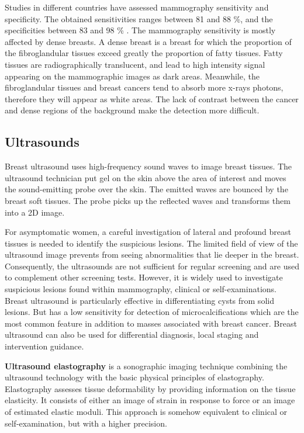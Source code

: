 
Studies in different countries have assessed mammography sensitivity and specificity. The obtained sensitivities ranges between 81 and 88 \%, and the specificities between 83 and 98 \% \citep{kemp_comparing_2015,hofvind_sensitivity_2012}. The mammography sensitivity is mostly affected by dense breasts. A dense breast is a breast for which the  proportion of the fibroglandular tissues exceed greatly the proportion of fatty tissues. Fatty tissues are radiographically translucent, and lead to high intensity signal appearing on the mammographic images as dark areas. Meanwhile, the fibroglandular tissues and breast cancers tend to absorb more x-rays photons, therefore they will appear as white areas. The lack of contrast between the cancer and dense regions of the background make the detection more difficult.      
 
\subsection{Ultrasounds}\label{subsection:ultrasound}

Breast ultrasound uses high-frequency sound waves to image breast tissues. The ultrasound technician put gel on the skin above the area of interest and moves the sound-emitting probe over the skin. The emitted waves are bounced by the breast soft tissues. The probe picks up the reflected waves and transforms them into a 2D image. 

For asymptomatic women, a careful investigation of lateral and profound breast tissues is needed to identify the suspicious lesions. The limited field of view of the ultrasound image prevents from seeing abnormalities that lie deeper in the breast. Consequently, the ultrasounds are not sufficient for regular screening and are used to complement other screening tests. However, it is widely used to investigate suspicious lesions found within mammography, clinical or self-examinations. Breast ultrasound is particularly effective in differentiating  cysts from solid lesions. But has a low sensitivity for detection of microcalcifications which are the most common feature in addition to masses associated with breast cancer. Breast ultrasound can also be used for differential diagnosis, local staging and intervention guidance.

\textbf{Ultrasound elastography} is a sonographic imaging technique combining the ultrasound technology with the basic physical principles of elastography. Elastography assesses tissue deformability by providing information on the tissue elasticity. It consists of either an image of strain in response to force or an image of estimated elastic moduli. This approach is somehow equivalent to clinical or self-examination, but with a higher precision.

